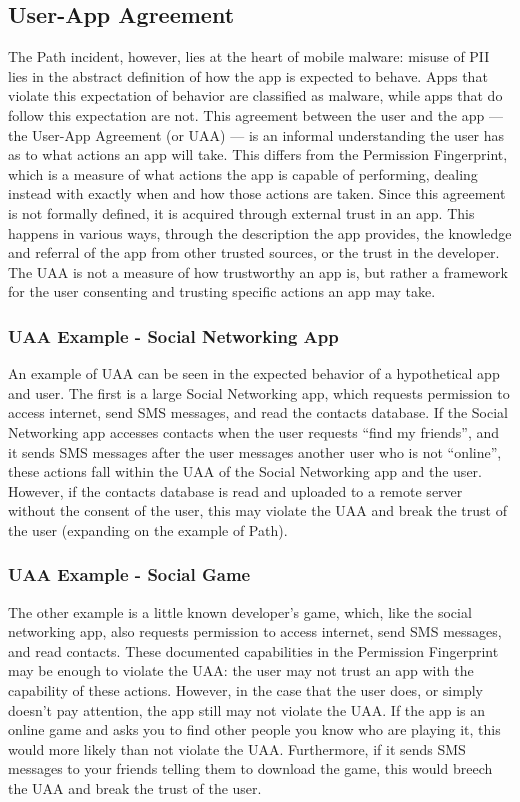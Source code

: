\documentclass{acm_proc_article-sp}
\begin{document}
\subsection{User-App Agreement}
The Path incident, however, lies at the heart of mobile malware: misuse of PII lies in the abstract definition of how the app is expected to behave. Apps that violate this expectation of behavior are classified as malware, while apps that do follow this expectation are not. This agreement between the user and the app --- the User-App Agreement (or UAA) --- is an informal understanding the user has as to what actions an app will take. This differs from the Permission Fingerprint, which is a measure of what actions the app is capable of performing, dealing instead with exactly when and how those actions are taken. Since this agreement is not formally defined, it is acquired through external trust in an app. This happens in various ways, through the description the app provides, the knowledge and referral of the app from other trusted sources, or the trust in the developer. The UAA is not a measure of how trustworthy an app is, but rather a framework for the user consenting and trusting specific actions an app may take.

\subsubsection{UAA Example - Social Networking App}
An example of UAA can be seen in the expected behavior of a hypothetical app and user. The first is a large Social Networking app, which requests permission to access internet, send SMS messages, and read the contacts database. If the Social Networking app accesses contacts when the user requests ``find my friends'', and it sends SMS messages after the user messages another user who is not ``online'', these actions fall within the UAA of the Social Networking app and the user. However, if the contacts database is read and uploaded to a remote server without the consent of the user, this may violate the UAA and break the trust of the user (expanding on the example of Path). 

\subsubsection{UAA Example - Social Game}
The other example is a little known developer's game, which, like the social networking app, also requests permission to access internet, send SMS messages, and read contacts. These documented capabilities in the Permission Fingerprint may be enough to violate the UAA: the user may not trust an app with the capability of these actions. However, in the case that the user does, or simply doesn't pay attention, the app still may not violate the UAA. If the app is an online game and asks you to find other people you know who are playing it, this would more likely than not violate the UAA. Furthermore, if it sends SMS messages to your friends telling them to download the game, this would breech the UAA and break the trust of the user.
\end{document}
